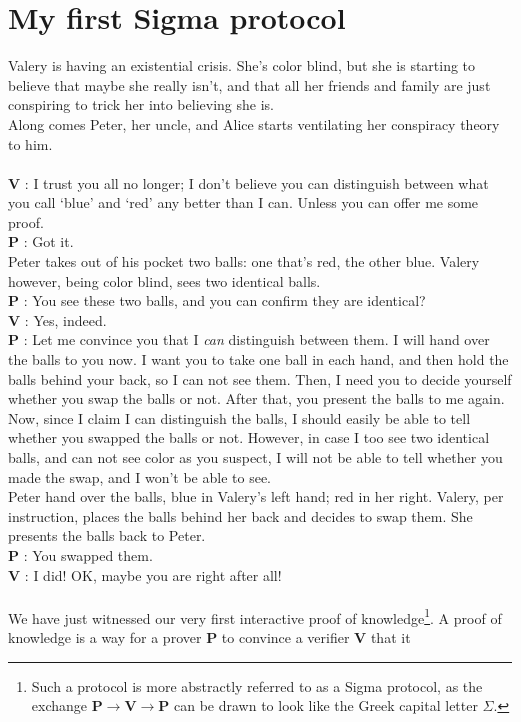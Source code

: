 \documentclass[11pt,oneside]{article}
\newcommand{\bP}{\textbf{P} }
\newcommand{\bV}{\textbf{V} }
\theoremstyle{definition}
\theoremstyle{remark}
\numberwithin{equation}{section}
\begin{document}
\section{My first Sigma protocol}
Valery is having an existential crisis. She's color blind, but she is starting to
believe that maybe she really isn't, and that all her friends and family are
just conspiring to trick her into believing she is.\\
Along comes Peter, her uncle, and Alice starts ventilating her conspiracy theory
to him.\\ \\
\bV: I trust you all no longer; I don't believe you can distinguish
between what you call `blue' and `red' any better than I can. Unless you can
offer me some proof.\\
\bP: Got it.\\
Peter takes out of his pocket two balls: one that's red, the other blue. Valery
however, being color blind, sees two identical balls.\\
\bP: You see these two balls, and you can confirm they are identical?\\
\bV: Yes, indeed.\\
\bP: Let me convince you that I \emph{can} distinguish between them.
I will hand over the balls to you now. I want you to take one ball
in each hand, and then hold the balls behind your back, so I can not see them.
Then, I need you to decide yourself whether you swap the balls or not. After
that, you present the balls to me again. Now, since I claim I can distinguish
the balls, I should easily be able to tell whether you swapped the balls or not.
However, in case I too see two identical balls, and can not see color as you
suspect, I will not be able to tell whether you made the swap, and I won't be
able to see.\\
Peter hand over the balls, blue in Valery's left hand; red in her right. Valery,
per instruction, places the balls behind her back and decides to swap them. She
presents the balls back to Peter.\\
\bP: You swapped them.\\
\bV: I did! OK, maybe you are right after all!
\\ \\
We have just witnessed our very first interactive proof of
knowledge\footnote{Such a protocol is more abstractly referred to as a Sigma
protocol, as the exchange $\bP \rightarrow \bV \rightarrow \bP$ can be drawn to
look like the Greek capital letter $\Sigma$.}. A
proof of knowledge is a way for a prover \bP to convince a verifier \bV that it
\end{document}
